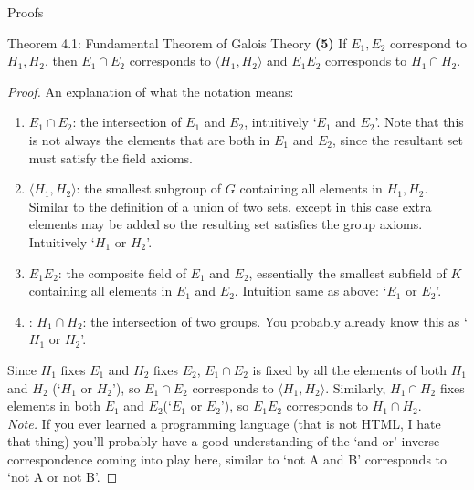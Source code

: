 \documentclass[12pt]{article}
\theoremstyle{definition}
\theoremstyle{definition}
\theoremstyle{definition}
\theoremstyle{definition}
\theoremstyle{definition}
\theoremstyle{definition}
\theoremstyle{definition}
\begin{document}
\begin{section}{Proofs}
\begin{subsection}{Theorem 4.1: Fundamental Theorem of Galois Theory}
        \noindent\textbf{(5)} If \(E_1, E_2\) correspond to \(H_1, H_2\), then \(E_1 \cap E_2\) corresponds to \(\langle H_1,H_2 \rangle\) and 
        \(E_1 E_2\) corresponds to \(H_1 \cap H_2\).
        \begin{proof}
            An explanation of what the notation means:
            \begin{enumerate}
                \item \(E_1 \cap E_2\): the intersection of \(E_1\) and \(E_2\), intuitively `\(E_1\) and \(E_2\)'. Note that this is not always the elements that are both in 
                \(E_1\) and \(E_2\), since the resultant set must satisfy the field axioms.
                \item \(\langle H_1,H_2 \rangle\): the smallest subgroup of \(G\) containing all elements in \(H_1, H_2\). Similar to the definition of a
                union of two sets, except in this case extra elements may be added so the resulting set satisfies the group axioms. Intuitively `\(H_1\) or \(H_2\)'.
                \item \(E_1 E_2\): the composite field of \(E_1\) and \(E_2\), essentially the smallest subfield of \(K\) containing all elements in \(E_1\)
                and \(E_2\). Intuition same as above: `\(E_1\) or \(E_2\)'.
                \item: \(H_1 \cap H_2\): the intersection of two groups. You probably already know this as `\(H_1\) or \(H_2\)'.
            \end{enumerate}
            Since \(H_1\) fixes \(E_1\) and \(H_2\) fixes \(E_2\), \(E_1 \cap E_2\) is fixed by all the elements of both \(H_1\) and \(H_2\) (`\(H_1\) or \(H_2\)'), so \(E_1 \cap E_2\) 
            corresponds to \(\langle H_1, H_2 \rangle\). Similarly, \(H_1\cap H_2\) fixes elements in both \(E_1\) and \(E_2\)(`\(E_1\) or \(E_2\)'), so \(E_1 E_2\) corresponds to \(H_1\cap H_2\).\\
            \noindent\textit{Note.} If you ever learned a programming language (that is not HTML, I hate that thing) you'll probably have a good understanding of the `and-or' inverse correspondence 
            coming into play here, similar to `not A and B' corresponds to `not A or not B'.
        \end{proof}
    \end{subsection}
\end{section}
\end{document}
